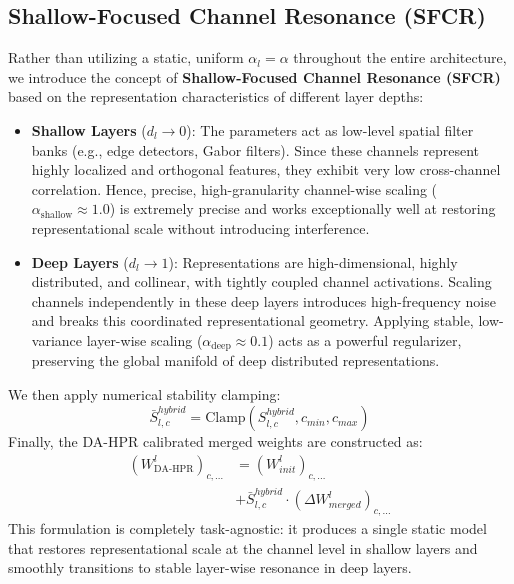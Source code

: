 \documentclass{article}
\theoremstyle{plain}
\theoremstyle{definition}
\theoremstyle{remark}
\begin{document}
\subsection{Shallow-Focused Channel Resonance (SFCR)}
Rather than utilizing a static, uniform $\alpha_l = \alpha$ throughout the entire architecture, we introduce the concept of \textbf{Shallow-Focused Channel Resonance (SFCR)} based on the representation characteristics of different layer depths:
\begin{itemize}
    \item \textbf{Shallow Layers} ($d_l \to 0$): The parameters act as low-level spatial filter banks (e.g., edge detectors, Gabor filters). Since these channels represent highly localized and orthogonal features, they exhibit very low cross-channel correlation. Hence, precise, high-granularity channel-wise scaling ($\alpha_{\text{shallow}} \approx 1.0$) is extremely precise and works exceptionally well at restoring representational scale without introducing interference.
    \item \textbf{Deep Layers} ($d_l \to 1$): Representations are high-dimensional, highly distributed, and collinear, with tightly coupled channel activations. Scaling channels independently in these deep layers introduces high-frequency noise and breaks this coordinated representational geometry. Applying stable, low-variance layer-wise scaling ($\alpha_{\text{deep}} \approx 0.1$) acts as a powerful regularizer, preserving the global manifold of deep distributed representations.
\end{itemize}

We then apply numerical stability clamping:
\begin{equation}
    \bar{S}_{l,c}^{hybrid} = \text{Clamp}(S_{l,c}^{hybrid}, c_{min}, c_{max})
\end{equation}
Finally, the DA-HPR calibrated merged weights are constructed as:
\begin{equation}
\begin{split}
    (W_{\text{DA-HPR}}^l)_{c, \dots} &= (W_{init}^l)_{c, \dots} \\
    &+ \bar{S}_{l,c}^{hybrid} \cdot (\Delta W_{merged}^l)_{c, \dots}
\end{split}
\end{equation}
This formulation is completely task-agnostic: it produces a single static model that restores representational scale at the channel level in shallow layers and smoothly transitions to stable layer-wise resonance in deep layers.
\end{document}
